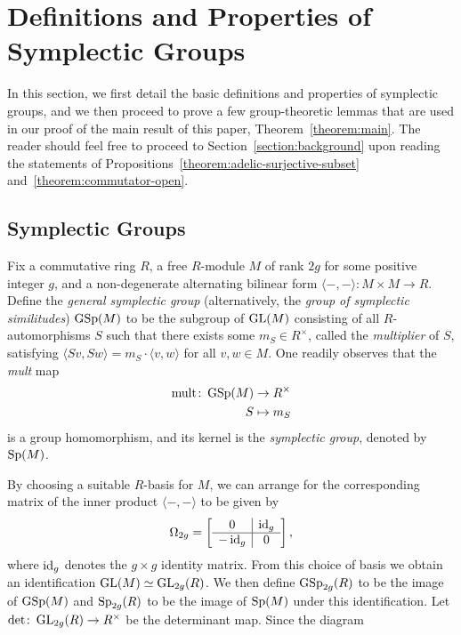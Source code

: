 \section{Definitions and Properties of Symplectic Groups} \label{gorilla}

In this section, we first detail the basic definitions and properties of symplectic groups, and we then proceed to prove a few group-theoretic lemmas that are used in our proof of the main result of this paper, Theorem~\ref{theorem:main}. The reader should feel free to proceed to Section~\ref{section:background} upon reading the statements of Propositions~\ref{theorem:adelic-surjective-subset} and~\ref{theorem:commutator-open}.

\subsection{Symplectic Groups}\label{subsection:stimpy}

Fix a commutative ring $R$, a free $R$-module $M$ of rank $2g$ for some positive integer $g$, and a non-degenerate alternating bilinear form $\langle -, - \rangle \colon M \times M \to R$. Define the {\it general symplectic group} (alternatively, the \emph{group of symplectic similitudes}) $\operatorname{GSp}(M)$ to be the subgroup of $\operatorname{GL}(M)$ consisting of all $R$-automorphisms $S$ such that there exists some $m_S \in R^\times$, called the {\it multiplier} of $S$, satisfying $\langle S v, Sw \rangle = m_S \cdot \langle v, w \rangle$ for all $v, w \in M$. One readily observes that the {\it mult} map
\begin{align*}
	\operatorname{mult} \colon \operatorname{GSp}(M) & \rightarrow R^\times \\
	S & \mapsto m_S
\end{align*}
is a group homomorphism, and its kernel is the {\it symplectic group}, denoted by $\operatorname{Sp}(M)$.

By choosing a suitable $R$-basis for $M$, we can arrange for the corresponding matrix of the inner product $\langle -, - \rangle$ to be given by
$$\Omega_{2g} = \left[\begin{array}{c|c} 0 & \operatorname{id}_g \\ \hline -\operatorname{id}_g & 0\end{array}\right],$$
where $\operatorname{id}_g$ denotes the $g \times g$ identity matrix. From this choice of basis we obtain an identification $\operatorname{GL}(M) \simeq \operatorname{GL}_{2g}(R)$. We then define $\operatorname{GSp}_{2g}(R)$ to be the image of $\operatorname{GSp}(M)$ and $\operatorname{Sp}_{2g}(R)$ to be the image of $\operatorname{Sp}(M)$ under this identification. Let $\det \colon \operatorname{GL}_{2g}(R) \to R^\times$ be the determinant map. Since the diagram
\begin{center}
\end{center}

